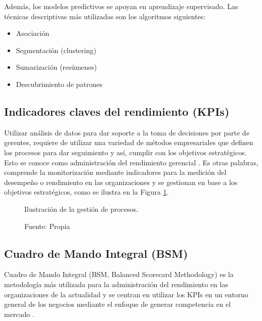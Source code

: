\documentclass[12pt,jou]{apa7}
\begin{document}
Además, los modelos predictivos se apoyan en aprendizaje supervisado. Las técnicas descriptivas más utilizadas son los algoritmos siguientes:
\begin{itemize}
\item Asociación
\item Segmentación (clustering)
\item Sumarización (resúmenes)
\item Descubrimiento de patrones
\end{itemize}


\subsection{Indicadores claves del rendimiento (KPIs)}
Utilizar análisis de datos para dar soporte a la toma de decisiones por parte de gerentes, requiere de utilizar una variedad de métodos empresariales que definen los procesos para dar seguimiento y así, cumplir con los objetivos estratégicos. Esto se conoce como administración del rendimiento gerencial \cite{Joyanes}. Es otras palabras, comprende la monitorización mediante indicadores para la medición del desempeño o rendimiento en las organizaciones y se gestionan en base a los objetivos estratégicos, como se ilustra en la Figura \ref{fig: KPIs}.

\begin{figure}[h]
\caption{Ilustración de la gestión de procesos.} 
\centering
{}
\caption*{ Fuente: Propia} \label{fig: KPIs}	
\end{figure} 


\subsection{Cuadro de Mando Integral (BSM)}
Cuadro de Mando Integral (BSM, Balanced Scorecard Methodology) es la metodología más utilizada para la administración del rendimiento en las organizaciones de la actualidad y se centran en utilizar los KPIs en un entorno general de los negocios mediante el enfoque de generar competencia en el mercado \cite{Joyanes}.\\
\end{document}
